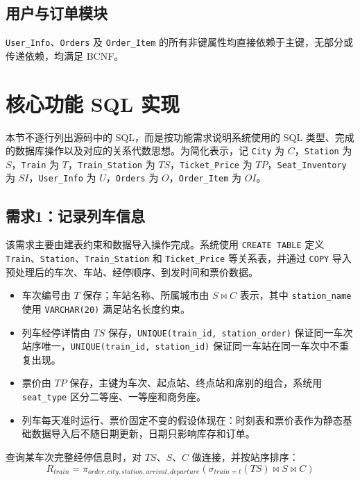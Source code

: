\documentclass[10pt,a4paper]{article}
\begin{document}
\subsection{用户与订单模块}
\texttt{User\_Info}、\texttt{Orders} 及 \texttt{Order\_Item} 的所有非键属性均直接依赖于主键，无部分或传递依赖，均满足 BCNF。

\section{核心功能 SQL 实现}

本节不逐行列出源码中的 SQL，而是按功能需求说明系统使用的 SQL 类型、完成的数据库操作以及对应的关系代数思想。为简化表示，记 \texttt{City} 为 $C$，\texttt{Station} 为 $S$，\texttt{Train} 为 $T$，\texttt{Train\_Station} 为 $TS$，\texttt{Ticket\_Price} 为 $TP$，\texttt{Seat\_Inventory} 为 $SI$，\texttt{User\_Info} 为 $U$，\texttt{Orders} 为 $O$，\texttt{Order\_Item} 为 $OI$。

\subsection{需求1：记录列车信息}

该需求主要由建表约束和数据导入操作完成。系统使用 \texttt{CREATE TABLE} 定义 \texttt{Train}、\texttt{Station}、\texttt{Train\_Station} 和 \texttt{Ticket\_Price} 等关系表，并通过 \texttt{COPY} 导入预处理后的车次、车站、经停顺序、到发时间和票价数据。

\begin{itemize}
    \item 车次编号由 $T$ 保存；车站名称、所属城市由 $S \bowtie C$ 表示，其中 \texttt{station\_name} 使用 \texttt{VARCHAR(20)} 满足站名长度约束。
    \item 列车经停详情由 $TS$ 保存，\texttt{UNIQUE(train\_id, station\_order)} 保证同一车次站序唯一，\texttt{UNIQUE(train\_id, station\_id)} 保证同一车站在同一车次中不重复出现。
    \item 票价由 $TP$ 保存，主键为车次、起点站、终点站和席别的组合，系统用 \texttt{seat\_type} 区分二等座、一等座和商务座。
    \item 列车每天准时运行、票价固定不变的假设体现在：时刻表和票价表作为静态基础数据导入后不随日期更新，日期只影响库存和订单。
\end{itemize}

查询某车次完整经停信息时，对 $TS$、$S$、$C$ 做连接，并按站序排序：
\[
R_{train}=\pi_{order,city,station,arrival,departure}
(\sigma_{train=t}(TS) \bowtie S \bowtie C)
\]
\end{document}
